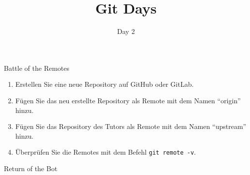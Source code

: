\documentclass[
    english, accentcolor=TUDa-1c,
    fontsize= 12pt, a4paper, aspectratio=169, colorback=true, fancy_row_colors, boxarc=3pt,
]{algoexercise}
\title{Git Days}
\subtitle{Day 2}
\begin{document}
    \maketitle

    \begin{task}{Battle of the Remotes}
        \begin{enumerate}
            \item Erstellen Sie eine neue Repository auf GitHub oder GitLab.
            \item Fügen Sie das neu erstellte Repository als Remote mit dem Namen \enquote{origin} hinzu.
            \item Fügen Sie das Repository des Tutors als Remote mit dem Namen \enquote{upstream} hinzu.
            \item Überprüfen Sie die Remotes mit dem Befehl \texttt{git remote -v}.
        \end{enumerate}
    \end{task}

    \begin{task}{Return of the Bot}

    \end{task}
\end{document}
